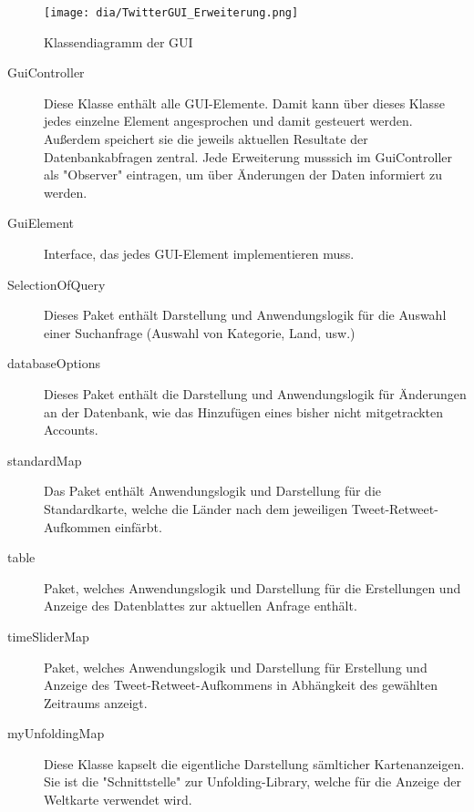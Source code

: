 \begin{figure}[h]
	\texttt{[image: dia/TwitterGUI\_Erweiterung.png]}
	\caption{Klassendiagramm der GUI}
	\label{fig:GUI}
\end{figure}
\begin{description}
	\item[GuiController] Diese Klasse enthält alle GUI-Elemente. Damit kann über dieses Klasse jedes einzelne Element angesprochen und damit gesteuert werden. Außerdem speichert sie die jeweils aktuellen Resultate der Datenbankabfragen zentral. Jede Erweiterung musssich im GuiController als "Observer" eintragen, um über Änderungen der Daten informiert zu werden. 
	\item[GuiElement] Interface, das jedes GUI-Element implementieren muss.
	\item [SelectionOfQuery] Dieses Paket enthält Darstellung und Anwendungslogik für die Auswahl einer Suchanfrage (Auswahl von Kategorie, Land, usw.)
	\item[databaseOptions] Dieses Paket enthält die Darstellung und Anwendungslogik für Änderungen an der Datenbank, wie das Hinzufügen eines bisher nicht mitgetrackten Accounts.
	
	\item [standardMap] Das Paket enthält Anwendungslogik und Darstellung für die Standardkarte, welche die Länder nach dem jeweiligen Tweet-Retweet-Aufkommen einfärbt.
	\item [table] Paket, welches Anwendungslogik und Darstellung für die Erstellungen und Anzeige des Datenblattes zur aktuellen Anfrage enthält.
	\item [timeSliderMap] Paket, welches Anwendungslogik und Darstellung für Erstellung und Anzeige des Tweet-Retweet-Aufkommens in Abhängkeit des gewählten Zeitraums anzeigt.
	\item [myUnfoldingMap] Diese Klasse kapselt die eigentliche Darstellung sämlticher Kartenanzeigen. Sie ist die "Schnittstelle" zur Unfolding-Library, welche für die Anzeige der Weltkarte verwendet wird.
\end{description}
